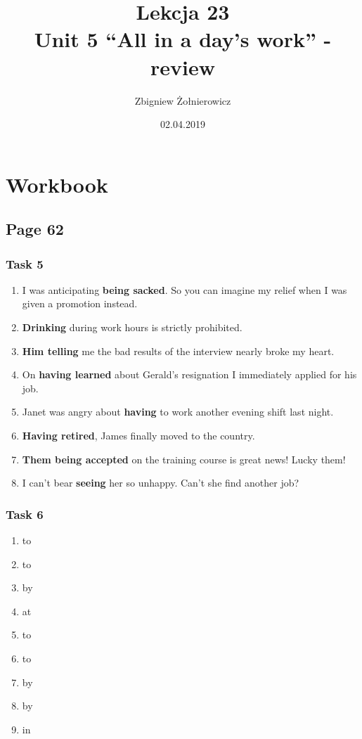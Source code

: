 \documentclass[a4paper]{article}
\begin{document}
\title{{\huge Lekcja 23} \\
{\large Unit 5 ``All in a day's work'' - review}}
\author{Zbigniew Żołnierowicz}
\date{02.04.2019}
\maketitle
\section{Workbook}
\subsection{Page 62}
\subsubsection{Task 5}
\begin{enumerate}
    \item I was anticipating \textbf{being sacked}. So you can imagine my relief when I was given a promotion instead.
    \item \textbf{Drinking} during work hours is strictly prohibited.
    \item \textbf{Him telling} me the bad results of the interview nearly broke my heart.
    \item On \textbf{having learned} about Gerald's resignation I immediately applied for his job.
    \item Janet was angry about \textbf{having} to work another evening shift last night.
    \item \textbf{Having retired}, James finally moved to the country.
    \item \textbf{Them being accepted} on the training course is great news! Lucky them!
    \item I can't bear \textbf{seeing} her so unhappy. Can't she find another job?
\end{enumerate}
\subsubsection{Task 6}
\begin{enumerate}
    \item to
    \item to
    \item by
    \item at
    \item to
    \item to
    \item by
    \item by
    \item in
\end{enumerate}
\end{document}
